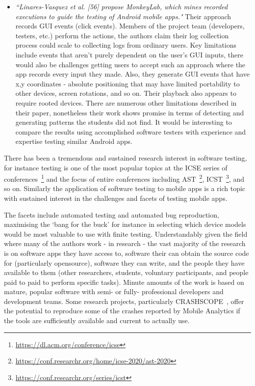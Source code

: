 \begin{itemize}
    \item \emph{``Linares-Vasquez et al. [56] propose MonkeyLab, which mines recorded executions to guide the testing of Android mobile apps."} Their approach records GUI events (click events). Members of the project team (developers, testers, etc.) perform the actions, the authors claim their log collection process could scale to collecting logs from ordinary users. Key limitations include events that aren't purely dependent on the user's GUI inputs, there would also be challenges getting users to accept such an approach where the app records every input they made. Also, they generate GUI events that have x,y coordinates - absolute positioning that may have limited portability to other devices, screen rotations, and so on. Their playback also appears to require rooted devices. There are numerous other limitations described in their paper, nonetheless their work shows promise in terms of detecting and generating patterns the students did not find. It would be interesting to compare the results using accomplished software testers with experience and expertise testing similar Android apps.
\end{itemize}

There has been a tremendous and sustained research interest in software testing, for instance testing is one of the most popular topics at the ICSE series of conferences~\footnote{\url{https://dl.acm.org/conference/icse}} and the focus of entire conferences including AST~\footnote{\url{https://conf.researchr.org/home/icse-2020/ast-2020}}, ICST~\footnote{\url{https://conf.researchr.org/series/icst}}, and so on. Similarly the application of software testing to mobile apps is a rich topic with sustained interest in the challenges and facets of testing mobile apps.

The facets include automated testing and automated bug reproduction, maximising the `bang for the buck' for instance in selecting which device models would be most valuable to use with finite testing. Understandably given the field where many of the authors work - in research - the vast majority of the research is on software apps they have access to, software their can obtain the source code for (particularly opensource), software they can write, and the people they have available to them (other researchers, students, voluntary participants, and people paid to paid to perform specific tasks). Minute amounts of the work is based on mature, popular software with semi- or fully- professional developers and development teams. Some research projects, particularly CRASHSCOPE~\citep{moran2016_automatically_drr_android_app_crashes}, offer the potential to reproduce some of the crashes reported by Mobile Analytics if the tools are sufficiently available and current to actually use.



